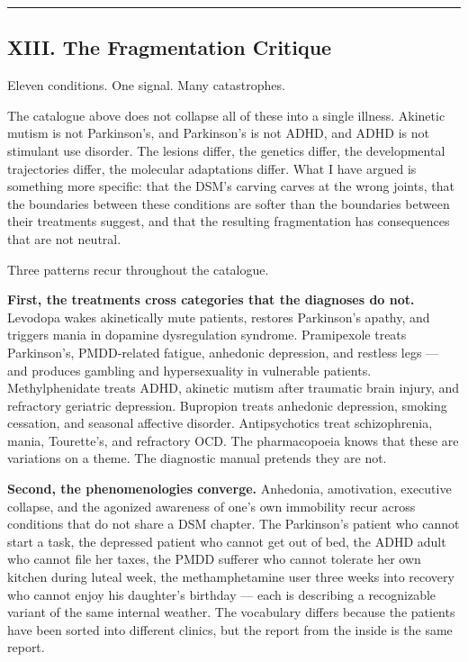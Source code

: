 \begin{center}\rule{0.5\linewidth}{0.5pt}\end{center}

\subsection{XIII. The Fragmentation Critique}\label{09_dopamine_spectrum-xiii.-the-fragmentation-critique}

Eleven conditions. One signal. Many catastrophes.

The catalogue above does not collapse all of these into a single illness. Akinetic mutism is not Parkinson's, and Parkinson's is not ADHD, and ADHD is not stimulant use disorder. The lesions differ, the genetics differ, the developmental trajectories differ, the molecular adaptations differ. What I have argued is something more specific: that the DSM's carving carves at the wrong joints, that the boundaries between these conditions are softer than the boundaries between their treatments suggest, and that the resulting fragmentation has consequences that are not neutral.

Three patterns recur throughout the catalogue.

\textbf{First, the treatments cross categories that the diagnoses do not.} Levodopa wakes akinetically mute patients, restores Parkinson's apathy, and triggers mania in dopamine dysregulation syndrome. Pramipexole treats Parkinson's, PMDD-related fatigue, anhedonic depression, and restless legs --- and produces gambling and hypersexuality in vulnerable patients. Methylphenidate treats ADHD, akinetic mutism after traumatic brain injury, and refractory geriatric depression. Bupropion treats anhedonic depression, smoking cessation, and seasonal affective disorder. Antipsychotics treat schizophrenia, mania, Tourette's, and refractory OCD. The pharmacopoeia knows that these are variations on a theme. The diagnostic manual pretends they are not.

\textbf{Second, the phenomenologies converge.} Anhedonia, amotivation, executive collapse, and the agonized awareness of one's own immobility recur across conditions that do not share a DSM chapter. The Parkinson's patient who cannot start a task, the depressed patient who cannot get out of bed, the ADHD adult who cannot file her taxes, the PMDD sufferer who cannot tolerate her own kitchen during luteal week, the methamphetamine user three weeks into recovery who cannot enjoy his daughter's birthday --- each is describing a recognizable variant of the same internal weather. The vocabulary differs because the patients have been sorted into different clinics, but the report from the inside is the same report.

